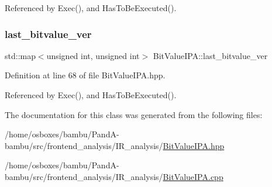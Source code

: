 Referenced by Exec(), and Has\+To\+Be\+Executed().

\mbox{\label{classBitValueIPA_a516ec9530d59d434020c42ea8a22b4f4}} 
\subsubsection{\texorpdfstring{last\+\_\+bitvalue\+\_\+ver}{last\_bitvalue\_ver}}
{\footnotesize\ttfamily std\+::map$<$unsigned int, unsigned int$>$ Bit\+Value\+I\+P\+A\+::last\+\_\+bitvalue\+\_\+ver\hspace{0.3cm}{\ttfamily [protected]}}



Definition at line 68 of file Bit\+Value\+I\+P\+A.\+hpp.



Referenced by Exec(), and Has\+To\+Be\+Executed().



The documentation for this class was generated from the following files\+:\begin{DoxyCompactItemize}
\item 
/home/osboxes/bambu/\+Pand\+A-\/bambu/src/frontend\+\_\+analysis/\+I\+R\+\_\+analysis/\hyperlink{BitValueIPA_8hpp}{Bit\+Value\+I\+P\+A.\+hpp}\item 
/home/osboxes/bambu/\+Pand\+A-\/bambu/src/frontend\+\_\+analysis/\+I\+R\+\_\+analysis/\hyperlink{BitValueIPA_8cpp}{Bit\+Value\+I\+P\+A.\+cpp}\end{DoxyCompactItemize}
